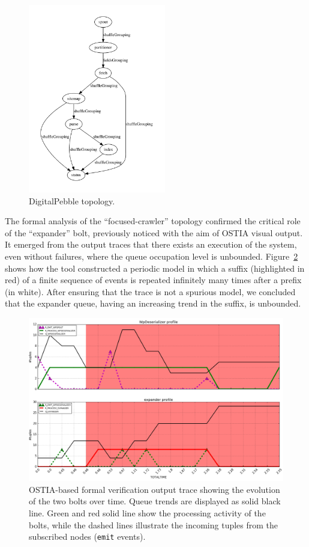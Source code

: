 \begin{figure}
\begin{center}
\includegraphics[width=6cm]{images/output/crawl}
		\caption{DigitalPebble topology.}
		\label{dp}
		\end{center}
\end{figure}
The formal analysis of the ``focused-crawler'' topology confirmed the critical role of the ``expander'' bolt, previously noticed with the aim of OSTIA visual output. It emerged from the output traces that there exists an execution of the system, even without failures, where the queue occupation level is unbounded. Figure~\ref{verif-trace} shows how the tool constructed a periodic model in which a suffix (highlighted in red) of a finite sequence of events is repeated infinitely many times after a prefix (in white). After ensuring that the trace is not a spurious model, we concluded that the expander queue, having an increasing trend in the suffix, is unbounded.


\begin{figure}
\centering
\includegraphics[width=1\linewidth]{images/verif-trace-color}
\caption{OSTIA-based formal verification output trace showing the evolution of the two bolts over time. Queue trends are displayed as solid black line. Green and red solid line show the processing activity of the bolts, while the dashed lines illustrate the incoming tuples from the subscribed nodes (\texttt{emit} events).}
\label{verif-trace}
\end{figure}

